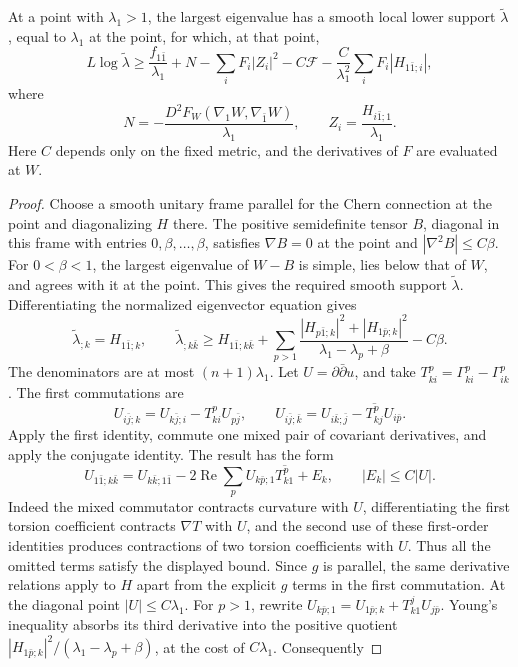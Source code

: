 \begin{lemma}\label{hessian:hermitian-eigenvalue-inequality}
At a point with $\lambda_1>1$, the largest eigenvalue has a smooth local lower support $\widetilde\lambda$, equal to $\lambda_1$ at the point, for which, at that point,
\[
 L\log\widetilde\lambda\geq
 \frac{f_{1\bar1}}{\lambda_1}+N
 -\sum_iF_i|Z_i|^2-C\mathcal F
 -\frac{C}{\lambda_1^2}\sum_iF_i|H_{1\bar1;i}|,
\]
where
\[
 N=-\frac{D^2F_W(\nabla_1W,\nabla_{\bar1}W)}{\lambda_1},
 \qquad Z_i=\frac{H_{i\bar1;1}}{\lambda_1}.
\]
Here $C$ depends only on the fixed metric, and the derivatives of $F$ are evaluated at $W$.
\end{lemma}
\begin{proof}
Choose a smooth unitary frame parallel for the Chern connection at the point and diagonalizing $H$ there. The positive semidefinite tensor $B$, diagonal in this frame with entries $0,\beta,\ldots,\beta$, satisfies $\nabla B=0$ at the point and $|\nabla^2B|\leq C\beta$. For $0<\beta<1$, the largest eigenvalue of $W-B$ is simple, lies below that of $W$, and agrees with it at the point. This gives the required smooth support $\widetilde\lambda$.
Differentiating the normalized eigenvector equation gives
\[
 \widetilde\lambda_{;k}=H_{1\bar1;k},\qquad
 \widetilde\lambda_{;k\bar k}\geq H_{1\bar1;k\bar k}
 +\sum_{p>1}\frac{|H_{p\bar1;k}|^2+|H_{1\bar p;k}|^2}
                         {\lambda_1-\lambda_p+\beta}-C\beta.
\]
The denominators are at most $(n+1)\lambda_1$. Let $U=\partial\bar\partial u$, and take $T^p_{ki}=\Gamma^p_{ki}-\Gamma^p_{ik}$. The first commutations are
\[
 U_{i\bar j;k}=U_{k\bar j;i}-T^p_{ki}U_{p\bar j},\qquad
 U_{i\bar j;\bar k}=U_{i\bar k;\bar j}
                          -\overline{T^p_{kj}}U_{i\bar p}.
\]
Apply the first identity, commute one mixed pair of covariant derivatives, and apply the conjugate identity. The result has the form
\[
 U_{1\bar1;k\bar k}=U_{k\bar k;1\bar1}
      -2\operatorname{Re}\sum_p U_{k\bar p;1}\overline{T^p_{k1}}+E_k,
 \qquad |E_k|\leq C|U|.
\]
Indeed the mixed commutator contracts curvature with $U$, differentiating the first torsion coefficient contracts $\nabla T$ with $U$, and the second use of these first-order identities produces contractions of two torsion coefficients with $U$. Thus all the omitted terms satisfy the displayed bound. Since $g$ is parallel, the same derivative relations apply to $H$ apart from the explicit $g$ terms in the first commutation. At the diagonal point $|U|\leq C\lambda_1$.
For $p>1$, rewrite $U_{k\bar p;1}=U_{1\bar p;k}+T^j_{k1}U_{j\bar p}$. Young's inequality absorbs its third derivative into the positive quotient $|H_{1\bar p;k}|^2/(\lambda_1-\lambda_p+\beta)$, at the cost of $C\lambda_1$. Consequently

\end{proof}
